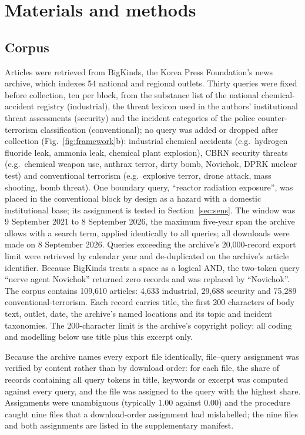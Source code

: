 \documentclass[1p,times]{elsarticle}
\begin{document}
\section{Materials and methods}
\label{sec:methods}

\subsection{Corpus}
Articles were retrieved from BigKinds, the Korea Press Foundation's news archive, which indexes 54 national and regional outlets. Thirty queries were fixed before collection, ten per block, from the substance list of the national chemical-accident registry (industrial), the threat lexicon used in the authors' institutional threat assessments (security) and the incident categories of the police counter-terrorism classification (conventional); no query was added or dropped after collection (Fig.~\ref{fig:framework}b): industrial chemical accidents (e.g.\ hydrogen fluoride leak, ammonia leak, chemical plant explosion), CBRN security threats (e.g.\ chemical weapon use, anthrax terror, dirty bomb, Novichok, DPRK nuclear test) and conventional terrorism (e.g.\ explosive terror, drone attack, mass shooting, bomb threat). One boundary query, ``reactor radiation exposure'', was placed in the conventional block by design as a hazard with a domestic institutional base; its assignment is tested in Section~\ref{sec:sens}. The window was 9 September 2021 to 8 September 2026, the maximum five-year span the archive allows with a search term, applied identically to all queries; all downloads were made on 8 September 2026. Queries exceeding the archive's 20,000-record export limit were retrieved by calendar year and de-duplicated on the archive's article identifier. Because BigKinds treats a space as a logical AND, the two-token query ``nerve agent Novichok'' returned zero records and was replaced by ``Novichok''. The corpus contains 109,610 articles: 4,633 industrial, 29,688 security and 75,289 conventional-terrorism. Each record carries title, the first 200 characters of body text, outlet, date, the archive's named locations and its topic and incident taxonomies. The 200-character limit is the archive's copyright policy; all coding and modelling below use title plus this excerpt only.

Because the archive names every export file identically, file--query assignment was verified by content rather than by download order: for each file, the share of records containing all query tokens in title, keywords or excerpt was computed against every query, and the file was assigned to the query with the highest share. Assignments were unambiguous (typically 1.00 against 0.00) and the procedure caught nine files that a download-order assignment had mislabelled; the nine files and both assignments are listed in the supplementary manifest.
\end{document}
